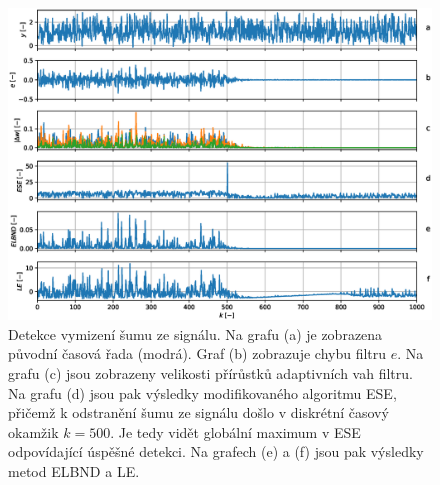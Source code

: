 \begin{figure}[ht!] 
    \centering
    \includegraphics[scale=0.65]{IMG/mdpi/noise_ext.eps} 
    \caption{Detekce vymizení šumu ze signálu. Na grafu (a) je zobrazena původní časová řada (modrá). Graf (b) zobrazuje chybu filtru $e$. Na grafu (c) jsou zobrazeny velikosti přírůstků adaptivních vah filtru. Na grafu (d) jsou pak výsledky modifikovaného algoritmu ESE, přičemž k odstranění šumu ze signálu došlo v diskrétní časový okamžik $k=500$. Je tedy vidět globální maximum v ESE odpovídající úspěšné detekci. Na grafech (e) a (f) jsou pak výsledky metod ELBND a LE.}
    \label{fig:noise_ext}
\end{figure}

